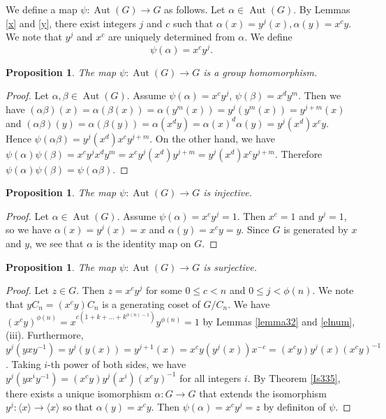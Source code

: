 \documentclass{amsart}
\newcommand{\lan}{\langle}
\newcommand{\ran}{\rangle}
\newtheorem{prop}[thm]{Proposition}
\begin{document}
We define a map $\psi : \operatorname{Aut}(G) \to G$ as follows.
Let $\alpha \in \operatorname{Aut}(G)$.
By Lemmas \ref{x} and \ref{y}, 
there exist integers $j$ and $c$ such that $\alpha(x)=y^j(x), \alpha(y)=x^c y$.
We note that $y^j$ and $x^c$ are uniquely determined from $\alpha$.
We define
\[\psi(\alpha)=x^c y^j .\]

\begin{prop}\label{gphom}
The map $\psi : \operatorname{Aut}(G) \to G$ is a group homomorphism.
\end{prop}

\begin{proof}
Let $\alpha, \beta \in \operatorname{Aut}(G)$.
Assume $\psi(\alpha)=x^c y^j$, $\psi(\beta)=x^{d}y^{m}$.
Then we have
$(\alpha\beta)(x)=\alpha(\beta(x))=\alpha(y^m(x))
=y^j(y^m(x))
=y^{j+m}(x)
$
and
$(\alpha\beta)(y)=\alpha(\beta(y))
=\alpha(x^{d}y)
=\alpha(x)^{d}\alpha(y)
=y^j(x^d)x^cy
$.
Hence
$\psi(\alpha \beta)=y^j(x^d)x^cy^{j+m}$.
On the other hand, we have
$\psi(\alpha) \psi(\beta)=x^cy^jx^{d}y^{m}
=x^cy^j(x^d)y^{j+m}
=y^j(x^d)x^c y^{j+m}
$.
Therefore $\psi(\alpha) \psi(\beta)
=\psi(\alpha \beta)$.
\end{proof}

\begin{prop}\label{inj}
The map $\psi : \operatorname{Aut}(G) \to G$ is injective.
\end{prop}

\begin{proof}
Let $\alpha \in \operatorname{Aut}(G)$.
Assume $\psi(\alpha)=x^c y^j=1$.
Then $x^c=1$ and $y^j=1$, so
we have $\alpha(x)=y^j(x)=x$ and 
$\alpha(y)=x^cy=y$.
Since $G$ is generated by $x$ and $y$, we see that $\alpha$ is the identity map on $G$.
\end{proof}

\begin{prop}\label{surj}
The map $\psi : \operatorname{Aut}(G) \to G$ is surjective.
\end{prop}

\begin{proof}
Let $z \in G$.
Then $z=x^c y^j$ for some $0 \leq c < n$ and $0 \leq j < \phi(n)$.
We note that $yC_n=(x^cy)C_n$ is a generating coset of $G/C_n$.
We have
$(x^cy)^{\phi(n)}=x^{c(1+k+\dots +k^{\phi(n)-1})}
y^{\phi(n)}
=1$ by Lemmas \ref{lemma32} and \ref{elnum}, (iii).
Furthermore, 
$y^j(yxy^{-1})=y^j(y(x))=y^{j+1}(x)=x^c y(y^{j}(x))x^{-c}=(x^cy)y^j(x)(x^cy)^{-1}$.
Taking $i$-th power of both sides, we have
$y^j(yx^iy^{-1})=(x^cy)y^j(x^i)(x^cy)^{-1}$ for all integers $i$.
By Theorem \ref{Is335}, there exists a unique isomorphism $\alpha :G \to G$ that extends the isomorphism $y^j : \lan x\ran \to \lan x \ran$ so that $\alpha(y)=x^cy$.
Then $\psi(\alpha)=x^cy^j = z$ by definiton of $\psi$.
\end{proof}
\end{document}
